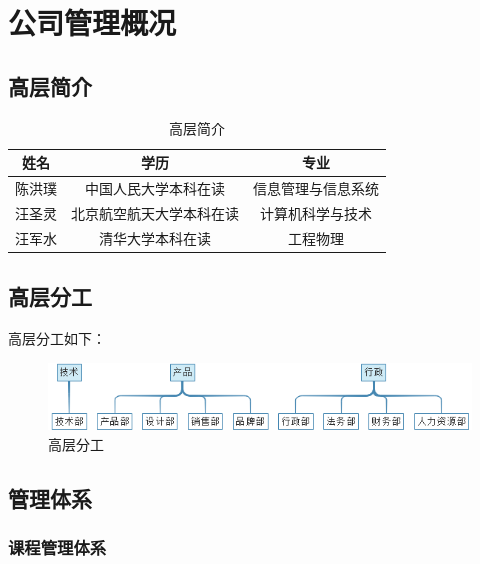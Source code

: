 \section{公司管理概况}
\subsection{高层简介}

\begin{table}[H]
  \centering
  \caption{高层简介}
    \begin{tabular}{|c|c|c|}
    \hline
    \textcolor[rgb]{ .298,  .282,  .239}{姓名} & \textcolor[rgb]{ .298,  .282,  .239}{学历} & \textcolor[rgb]{ .298,  .282,  .239}{专业} \\
    \hline
    \textcolor[rgb]{ .298,  .282,  .239}{陈洪璞} & \textcolor[rgb]{ .298,  .282,  .239}{中国人民大学本科在读} & \textcolor[rgb]{ .298,  .282,  .239}{信息管理与信息系统} \\
    \hline
    \textcolor[rgb]{ .298,  .282,  .239}{汪圣灵} & \textcolor[rgb]{ .298,  .282,  .239}{北京航空航天大学本科在读} & \textcolor[rgb]{ .298,  .282,  .239}{计算机科学与技术} \\
    \hline
    \textcolor[rgb]{ .298,  .282,  .239}{汪军水} & \textcolor[rgb]{ .298,  .282,  .239}{清华大学本科在读} & \textcolor[rgb]{ .298,  .282,  .239}{工程物理} \\
    \hline
    \end{tabular}%
  \label{tab:gaocengjeshao}%
\end{table}%

\subsection{高层分工}
高层分工如下：
\begin{figure}[H]
	\centering
	\includegraphics[width=0.9\columnwidth]{figures/high_level_division}
	\caption{高层分工}
	\label{fg:high_level_division}
\end{figure}

\subsection{管理体系}
\subsubsection{课程管理体系}\

